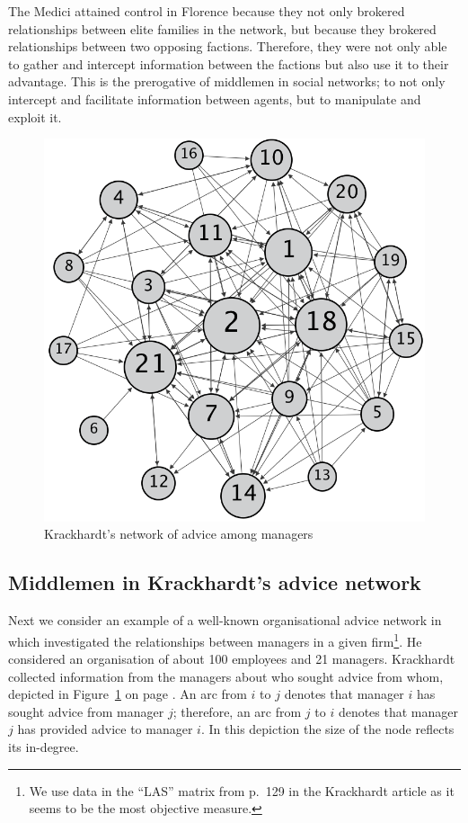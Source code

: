 \medskip\noindent The Medici attained control in Florence because they not only brokered relationships between elite families in the network, but because they brokered relationships between two opposing factions. Therefore, they were not only able to gather and intercept information between the factions but also use it to their advantage. This is the prerogative of middlemen in social networks; to not only intercept and facilitate information between agents, but to manipulate and exploit it.

\begin{figure}[t]
\centering
\includegraphics[scale=0.45]{imgs/krack.png}
\caption{Krackhardt's network of advice among managers}
\label{krackhardtnetwork}
\end{figure}

\subsection{Middlemen in Krackhardt's advice network}

Next we consider an example of a well-known organisational advice network in which \citet{Krackhardt1987} investigated the relationships between managers in a given firm\footnote{We use data in the ``LAS'' matrix from p.~129 in the Krackhardt article as it seems to be the most objective measure.}. He considered an organisation of about 100 employees and 21 managers. Krackhardt collected information from the managers about who sought advice from whom, depicted in Figure~\ref{krackhardtnetwork} on page \pageref{krackhardtnetwork}. An arc from $i$ to $j$ denotes that manager $i$ has sought advice from manager $j$; therefore, an arc from $j$ to $i$ denotes that manager $j$ has provided advice to manager $i$. In this depiction the size of the node reflects its in-degree.

